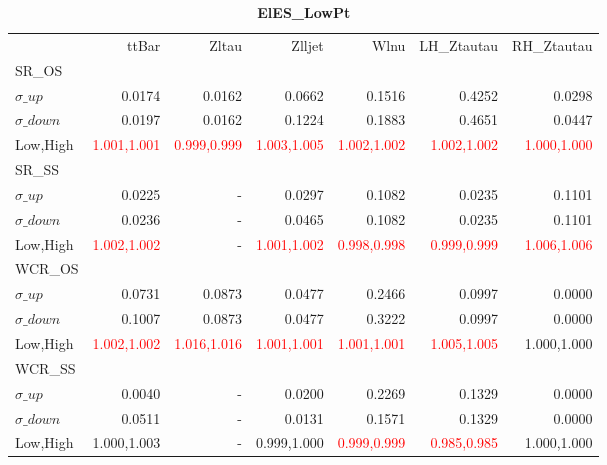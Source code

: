 \documentclass[11pt,oneside,a4paper]{article}
\begin{document}
\begin{table}
\caption{\bf{ElES\_LowPt}}
\centering
\begin{tabular}{lrrrrrr}
& ttBar & Zltau & Zlljet & Wlnu & LH\_Ztautau & RH\_Ztautau \\

SR\_OS &  &  &  &  &  &  \\
$\sigma\_up$ & 0.0174 & 0.0162 & 0.0662 & 0.1516 & 0.4252 & 0.0298 \\
$\sigma\_down$ & 0.0197 & 0.0162 & 0.1224 & 0.1883 & 0.4651 & 0.0447 \\
Low,High & \textcolor{red}{1.001,1.001} & \textcolor{red}{0.999,0.999} & \textcolor{red}{1.003,1.005} & \textcolor{red}{1.002,1.002} & \textcolor{red}{1.002,1.002} & \textcolor{red}{1.000,1.000} \\

\hline
SR\_SS &  &  &  &  &  &  \\
$\sigma\_up$ & 0.0225 & - & 0.0297 & 0.1082 & 0.0235 & 0.1101 \\
$\sigma\_down$ & 0.0236 & - & 0.0465 & 0.1082 & 0.0235 & 0.1101 \\
Low,High & \textcolor{red}{1.002,1.002} & - & \textcolor{red}{1.001,1.002} & \textcolor{red}{0.998,0.998} & \textcolor{red}{0.999,0.999} & \textcolor{red}{1.006,1.006} \\

\hline
WCR\_OS &  &  &  &  &  &  \\
$\sigma\_up$ & 0.0731 & 0.0873 & 0.0477 & 0.2466 & 0.0997 & 0.0000 \\
$\sigma\_down$ & 0.1007 & 0.0873 & 0.0477 & 0.3222 & 0.0997 & 0.0000 \\
Low,High & \textcolor{red}{1.002,1.002} & \textcolor{red}{1.016,1.016} & \textcolor{red}{1.001,1.001} & \textcolor{red}{1.001,1.001} & \textcolor{red}{1.005,1.005} & 1.000,1.000 \\

\hline
WCR\_SS &  &  &  &  &  &  \\
$\sigma\_up$ & 0.0040 & - & 0.0200 & 0.2269 & 0.1329 & 0.0000 \\
$\sigma\_down$ & 0.0511 & - & 0.0131 & 0.1571 & 0.1329 & 0.0000 \\
Low,High & 1.000,1.003 & - & 0.999,1.000 & \textcolor{red}{0.999,0.999} & \textcolor{red}{0.985,0.985} & 1.000,1.000 \\

\end{tabular}
\end{table}
\end{document}

